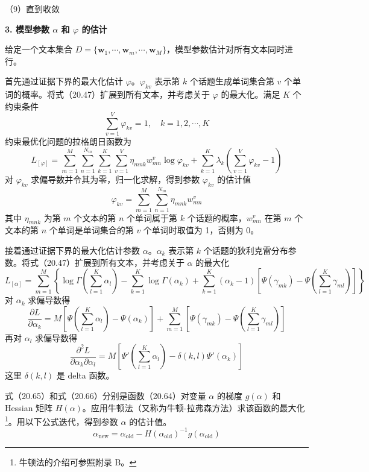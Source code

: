 \documentclass[UTF8, 12pt, fontset=fandol, oneside]{ctexart}
\begin{document}
（9）直到收敛

\noindent\textbf{3. 模型参数 $\alpha$ 和 $\varphi$ 的估计}

给定一个文本集合 $D=\{\mathbf{w}_1,\cdots,\mathbf{w}_m,\cdots,\mathbf{w}_M\}$，模型参数估计对所有文本同时进行。

首先通过证据下界的最大化估计 $\varphi$。$\varphi_{kv}$ 表示第 $k$ 个话题生成单词集合第 $v$ 个单词的概率。将式（20.47）扩展到所有文本，并考虑关于 $\varphi$ 的最大化。满足 $K$ 个约束条件
\[
\sum_{v=1}^V \varphi_{kv}=1,\quad k=1,2,\cdots,K
\]
约束最优化问题的拉格朗日函数为
\begin{equation}
L_{[\varphi]}=\sum_{m=1}^M\sum_{n=1}^{N_m}\sum_{k=1}^K\sum_{v=1}^V \eta_{mnk}w_{mn}^v\log\varphi_{kv}+\sum_{k=1}^K\lambda_k\left(\sum_{v=1}^V\varphi_{kv}-1\right)
\tag{20.63}
\end{equation}
对 $\varphi_{kv}$ 求偏导数并令其为零，归一化求解，得到参数 $\varphi_{kv}$ 的估计值
\begin{equation}
\varphi_{kv}=\sum_{m=1}^M\sum_{n=1}^{N_m}\eta_{mnk}w_{mn}^v
\tag{20.64}
\end{equation}
其中 $\eta_{mnk}$ 为第 $m$ 个文本的第 $n$ 个单词属于第 $k$ 个话题的概率，$w_{mn}^v$ 在第 $m$ 个文本的第 $n$ 个单词是单词集合的第 $v$ 个单词时取值为 1，否则为 0。

接着通过证据下界的最大化估计参数 $\alpha$。$\alpha_k$ 表示第 $k$ 个话题的狄利克雷分布参数。将式（20.47）扩展到所有文本，并考虑关于 $\alpha$ 的最大化
\begin{equation}
L_{[\alpha]}=\sum_{m=1}^M\left\{\log\Gamma\left(\sum_{l=1}^K\alpha_l\right)-\sum_{k=1}^K\log\Gamma(\alpha_k)+\sum_{k=1}^K(\alpha_k-1)\left[\Psi(\gamma_{mk})-\Psi\left(\sum_{l=1}^K\gamma_{ml}\right)\right]\right\}
\tag{20.65}
\end{equation}
对 $\alpha_k$ 求偏导数得
\begin{equation}
\frac{\partial L}{\partial\alpha_k}=M\left[\Psi\left(\sum_{l=1}^K\alpha_l\right)-\Psi(\alpha_k)\right]+\sum_{m=1}^M\left[\Psi(\gamma_{mk})-\Psi\left(\sum_{l=1}^K\gamma_{ml}\right)\right]
\tag{20.66}
\end{equation}
再对 $\alpha_l$ 求偏导数得
\begin{equation}
\frac{\partial^2 L}{\partial\alpha_k\partial\alpha_l}=M\left[\Psi'\left(\sum_{l=1}^K\alpha_l\right)-\delta(k,l)\Psi'(\alpha_k)\right]
\tag{20.67}
\end{equation}
这里 $\delta(k,l)$ 是 delta 函数。

式（20.65）和式（20.66）分别是函数（20.64）对变量 $\alpha$ 的梯度 $g(\alpha)$ 和 Hessian 矩阵 $H(\alpha)$。应用牛顿法（又称为牛顿-拉弗森方法）求该函数的最大化\footnote{牛顿法的介绍可参照附录 B。}。用以下公式迭代，得到参数 $\alpha$ 的估计值。
\begin{equation}
\alpha_{\mathrm{new}}=\alpha_{\mathrm{old}}-H(\alpha_{\mathrm{old}})^{-1}g(\alpha_{\mathrm{old}})
\tag{20.68}
\end{equation}
\end{document}
